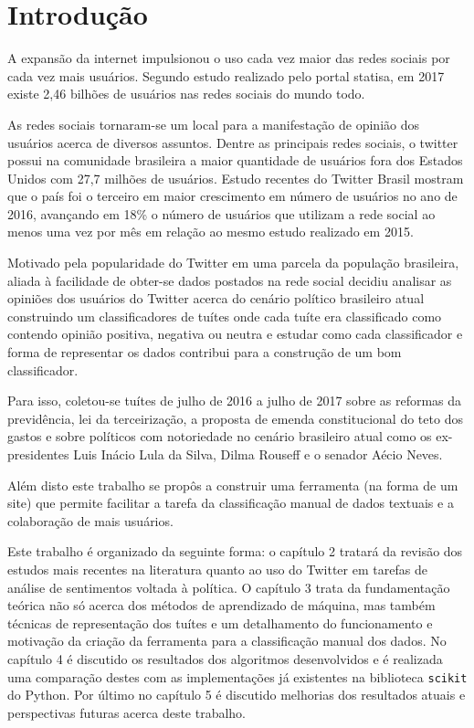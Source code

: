 \chapter{Introdução}

A expansão da internet impulsionou o uso cada vez maior das redes sociais por cada vez mais
usuários. Segundo estudo realizado pelo portal statisa\cite{statisa}, em 2017 existe
2,46 bilhões de usuários nas redes sociais do mundo todo.

As redes sociais tornaram-se um local para a manifestação de opinião dos usuários acerca de
diversos assuntos. Dentre as principais redes sociais, o twitter possui na comunidade brasileira
a maior quantidade de usuários fora dos Estados Unidos com 27,7 milhões de usuários.
Estudo recentes do Twitter Brasil mostram que o país foi o terceiro em maior crescimento em número
de usuários no ano de 2016, avançando em 18\% o número de usuários que utilizam a rede social ao
menos uma vez por mês em relação ao mesmo estudo realizado em 2015.\cite{twitterFolha}

Motivado pela popularidade do Twitter em uma parcela da população brasileira, aliada à facilidade
de obter-se dados postados na rede social decidiu analisar as opiniões dos usuários do Twitter
acerca do cenário político brasileiro atual construindo um classificadores de tuítes onde cada
tuíte era classificado como contendo opinião positiva, negativa ou neutra e estudar como
cada classificador e forma de representar os dados contribui para a construção de um bom
classificador. 

Para isso, coletou-se tuítes de julho de 2016 a julho de 2017 sobre as reformas da previdência, lei
da terceirização, a proposta de emenda constitucional do teto dos gastos e sobre políticos
com notoriedade no cenário brasileiro atual como os ex-presidentes Luis Inácio Lula da Silva,
Dilma Rouseff e o senador Aécio Neves.

Além disto este trabalho se propôs a construir uma ferramenta (na forma de um site) que permite
facilitar a tarefa da classificação manual de dados textuais e a colaboração de mais usuários.

Este trabalho é organizado da seguinte forma: o capítulo 2 tratará da revisão dos estudos mais
recentes na literatura quanto ao uso do Twitter em tarefas de análise de sentimentos voltada à
política. O capítulo 3 trata da fundamentação teórica não só acerca dos métodos de aprendizado de
máquina, mas também técnicas de representação dos tuítes e um detalhamento do funcionamento e motivação
da criação da ferramenta para a classificação manual dos dados. No capítulo 4 é discutido os resultados
dos algoritmos desenvolvidos e é realizada uma comparação destes com as implementações já existentes
na biblioteca \texttt{scikit} do Python. Por último no capítulo 5 é discutido melhorias dos resultados
atuais e perspectivas futuras acerca deste trabalho.